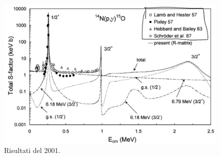 \begin{figure}[h]
	\centering
	\includegraphics[scale=0.5]{Immagini/0422_Se3.png}
	\caption{Risultati del 2001.}
	\label{0422_2001}
\end{figure}






